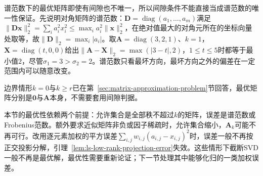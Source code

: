 谱范数下的最优矩阵即使有间隙也不唯一，所以间隙条件不能直接当成谱范数的唯一性保证。先说明对角矩阵的谱范数：$\bm D=\operatorname{diag}(a_1,\ldots,a_m)$满足$\lVert\bm D\bm x\rVert_2^2=\sum_ia_i^2x_i^2\leq\max_ia_i^2\lVert\bm x\rVert_2^2$，在绝对值最大的对角元所在的坐标向量处取等，故$\lVert\bm D\rVert_2=\max_i\lvert a_i\rvert$。取$\bm A=\operatorname{diag}(3,2,1)$、$k=1$，$\bm X=\operatorname{diag}(t,0,0)$给出$\lVert\bm A-\bm X\rVert_2=\max(\lvert3-t\rvert,2)$，$1\leq t\leq5$时都等于最小值$2$，尽管$\sigma_1=3>\sigma_2=2$。谱范数只看最坏方向，最坏方向之外的偏差在一定范围内可以随意改变。

边界情形$k=0$与$k\geq r$已在第~\ref{sec:matrix-approximation-problem}节回答，最优矩阵分别是$\bm0$与$\bm A$本身，不需要套用间隙判据。

本节的最优性依赖两个前提：允许集合是全部秩不超过$k$的矩阵，误差是谱范数或Frobenius范数。额外要求近似矩阵非负或因子稀疏时，允许集合缩小，$\bm A_k$可能不再可行。改用逐元素加权的平方误差$\sum_{i,j}w_{i,j}(a_{i,j}-x_{i,j})^2$时，误差一般不再按正交投影分解，引理~\ref{lem:ls-low-rank-projection-error}失效。这些情形下截断SVD一般不再是最优解，最优性需要重新论证；下一节处理其中能够化归的一类加权误差。
